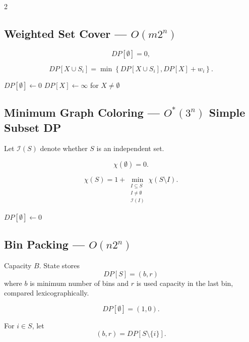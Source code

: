 \documentclass[8pt]{extarticle}
\theoremstyle{definition}
\begin{document}
\begin{multicols*}{2}
\subsection{Weighted Set Cover --- $O(m2^n)$}

\[
DP[\emptyset]=0,
\]

\[
DP[X\cup S_i]
=
\min\left\{
DP[X\cup S_i],
DP[X]+w_i
\right\}.
\]

\begin{algorithm}[H]
\DontPrintSemicolon
$DP[\emptyset]\gets0$\;
$DP[X]\gets\infty$ for $X\ne\emptyset$\;
\;
\end{algorithm}


\subsection{Minimum Graph Coloring --- $O^*(3^n)$ Simple Subset DP}

Let $\mathcal I(S)$ denote whether $S$ is an independent set.

\[
\chi(\emptyset)=0.
\]

\[
\chi(S)
=
1+
\min_{\substack{I\subseteq S\\I\ne\emptyset\\
                 \mathcal I(I)}}
\chi(S\setminus I).
\]

\begin{algorithm}[H]
\DontPrintSemicolon
$DP[\emptyset]\gets0$\;
\;
\end{algorithm}


\subsection{Bin Packing --- $O(n2^n)$}

Capacity $B$.  State stores
\[
DP[S]=(b,r)
\]
where $b$ is minimum number of bins and $r$ is used
capacity in the last bin, compared lexicographically.

\[
DP[\emptyset]=(1,0).
\]

For $i\in S$, let
\[
(b,r)=DP[S\setminus\{i\}].
\]


\end{multicols*}
\end{document}
